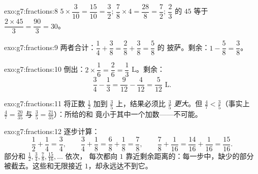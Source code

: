 \begin{solution}{exo:g7:fractions:8}
$5 \times \dfrac{3}{10} = \dfrac{15}{10} = \dfrac32$; \quad
$\dfrac78 \times 4 = \dfrac{28}{8} = \dfrac72$; \quad
$\dfrac23$ 的 $45$ 等于 $\dfrac{2 \times 45}{3} = \dfrac{90}{3} = 30$。
\end{solution}

\begin{solution}{exo:g7:fractions:9}
两者合计：$\dfrac14 + \dfrac38 = \dfrac28 + \dfrac38 = \dfrac58$ 的
披萨。剩余：$1 - \dfrac58 = \dfrac38$。
\end{solution}

\begin{solution}{exo:g7:fractions:10}
倒出：$2 \times \dfrac16 = \dfrac26 = \dfrac13$ L。剩余：
\[
\frac34 - \frac13 = \frac{9}{12} - \frac{4}{12} = \frac{5}{12}
\text{ L}.
\]
\end{solution}

\begin{solution}{exo:g7:fractions:11}
将正数 $\frac12$ 加到 $\frac35$ 上，结果必须比 $\frac35$
\emph{更大}。但 $\frac47 < \frac35$（事实上
$\frac47 = \frac{20}{35}$ 与 $\frac35 = \frac{21}{35}$）：所给的和
竟小于其中一个加数——不可能。
\end{solution}

\begin{solution}{exo:g7:fractions:12}
逐步计算：
\[
\frac12 + \frac14 = \frac34, \qquad
\frac34 + \frac18 = \frac68 + \frac18 = \frac78, \qquad
\frac78 + \frac1{16} = \frac{14}{16} + \frac1{16} = \frac{15}{16}.
\]
部分和 $\frac12, \frac34, \frac78, \frac{15}{16}, \dots$ 依次，
每次都向 $1$ 靠近剩余距离的：每一步中，缺少的部分
被截去。这些和无限接近 $1$，却永远达不到它。
\end{solution}

